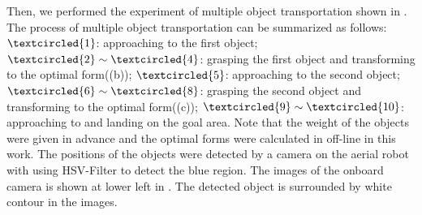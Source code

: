 Then, we performed the experiment of multiple object transportation shown in . The process of multiple object transportation can be summarized as follows: $\textcircled{\scriptsize 1}$: approaching to the first object; $\textcircled{\scriptsize 2}\sim \textcircled{\scriptsize 4}$: grasping the first object and transforming to the optimal form((b)); $\textcircled{\scriptsize 5}$: approaching to the second object; $\textcircled{\scriptsize 6}\sim \textcircled{\scriptsize 8}$: grasping the second object and transforming to the optimal form((c)); $\textcircled{\scriptsize 9}\sim \textcircled{\scriptsize 10}$: approaching to and landing on the goal area. Note that the weight of the objects were given in advance and the optimal forms were calculated in off-line in this work. The positions of the objects were detected by a camera on the aerial robot with using HSV-Filter to detect the blue region. The images of the onboard camera is shown at lower left in . The detected object is surrounded by white contour in the images.
